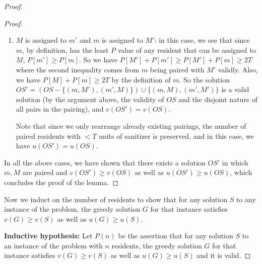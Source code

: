 \documentclass[answers]{exam}
\begin{document}
\begin{questions}
\begin{solution}
\begin{proof}
\begin{proof}
\begin{enumerate}
    \item $M$ is assigned to $m'$ and $m$ is assigned to $M'$: in this case, we see that since $m$, by definition, has the least $P$ value of any resident that can be assigned to $M$, $P[m'] \ge P[m]$. So we have $P[M'] + P[m'] \ge P[M'] + P[m] \ge 2T$ where the second inequality comes from $m$ being paired with $M'$ validly. Also, we have $P[M] + P[m] \ge 2T$ by the definition of $m$. So the solution $OS' = \left(OS - \{(m, M'), (m', M)\}\right) \cup \{(m, M), (m', M')\}$ is a valid solution (by the argument above, the validity of $OS$ and the disjoint nature of all pairs in the pairing), and $v(OS') = v(OS)$.
    
    Note that since we only rearrange already existing pairings, the number of paired residents with $< T$ units of sanitizer is preserved, and in this case, we have $u(OS') = u(OS)$.
    
\end{enumerate}
In all the above cases, we have shown that there exists a solution $OS'$ in which $m, M$ are paired and $v(OS') \ge v(OS)$ as well as $u(OS') \ge u(OS)$, which concludes the proof of the lemma.
\end{proof}
Now we induct on the number of residents to show that for any solution $S$ to any instance of the problem, the greedy solution $G$ for that instance satisfies $v(G) \ge v(S)$ as well as $u(G) \ge u(S)$.

\textbf{Inductive hypothesis:} Let $P(n)$ be the assertion that for any solution $S$ to an instance of the problem with $n$ residents, the greedy solution $G$ for that instance satisfies $v(G) \ge v(S)$ as well as $u(G) \ge u(S)$ and it is valid.


\end{proof}
\end{solution}
\end{questions}
\end{document}
